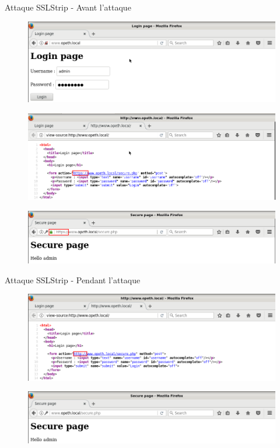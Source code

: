 \begin{frame}{Attaque SSLStrip - Avant l'attaque}
  \begin{figure}
    \includegraphics[width=0.7\linewidth]{../medias/sslstrip/screen1.png}
  \end{figure}
  \begin{figure}
    \includegraphics[width=0.7\linewidth]{../medias/sslstrip/screen2.png}
  \end{figure}
  \begin{figure}
    \includegraphics[width=0.7\linewidth]{../medias/sslstrip/screen3.png}
  \end{figure}
\end{frame}

\begin{frame}{Attaque SSLStrip - Pendant l'attaque}
  \begin{figure}
    \includegraphics[width=0.9\linewidth]{../medias/sslstrip/screen5.png}
  \end{figure}
  \begin{figure}
    \includegraphics[width=0.9\linewidth]{../medias/sslstrip/screen6.png}
  \end{figure}
\end{frame}

